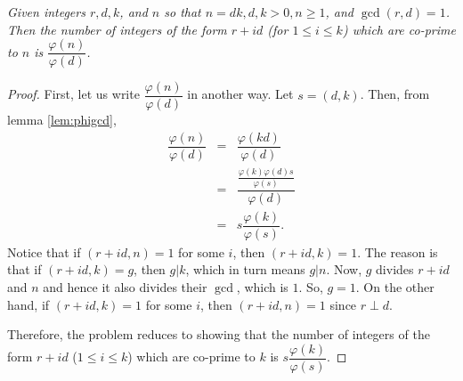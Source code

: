 \documentclass[12pt]{subfile}
\begin{document}
		\begin{theorem}\slshape \label{thm:menon-lemma}
			Given integers $r,d, k$, and $n$ so that $n=dk, d, k>0,n\geq1$, and $\gcd(r,d)=1$. Then the number of integers of the form $r+id$ (for $1 \leq i \leq k$) which are co-prime to $n$ is $\dfrac{\varphi(n)}{\varphi(d)}$.
		\end{theorem}

		\begin{proof}
			First, let us write $\dfrac{\varphi(n)}{\varphi(d)}$ in another way. Let $s = (d,k)$. Then, from lemma \ref{lem:phigcd},
				\begin{eqnarray*}
					\dfrac{\varphi(n)}{\varphi(d)} &=& \dfrac{\varphi(kd)}{\varphi(d)}\\
										   &=& \dfrac{\frac{\varphi(k) \varphi(d) s}{\varphi(s)}}{\varphi(d)}\\
										   &=& s \dfrac{\varphi(k)}{\varphi(s)}.
				\end{eqnarray*}
			Notice that if $(r+id , n)=1$ for some $i$, then $(r+id , k) = 1$. The reason is that if $(r+id , k) = g$, then $g | k$, which in turn means $g|n$. Now, $g$ divides $r+id$ and $n$ and hence it also divides their $\gcd$, which is $1$. So, $g=1$. On the other hand, if $(r+id, k)=1$ for some $i$, then $(r+id, n)=1$ since $r \perp d$.

			Therefore, the problem reduces to showing that the number of integers of the form $r+id$ ($1 \leq i \leq k$) which are co-prime to $k$ is $s \dfrac{\varphi(k)}{\varphi(s)}$.


\end{proof}
\end{document}

